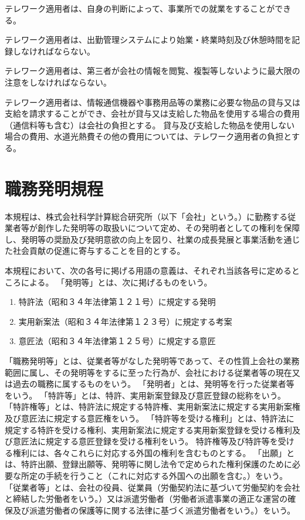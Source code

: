\documentclass[10pt,a4paper,uplatex]{jsarticle}
\begin{document}
テレワーク適用者は、自身の判断によって、事業所での就業をすることができる。

テレワーク適用者は、出勤管理システムにより始業・終業時刻及び休憩時間を記録しなければならない。

テレワーク適用者は、第三者が会社の情報を閲覧、複製等しないように最大限の注意をしなければならない。

テレワーク適用者は、情報通信機器や事務用品等の業務に必要な物品の貸与又は支給を請求することができ、会社が貸与又は支給した物品を使用する場合の費用（通信料等も含む）は会社の負担とする。
\term 貸与及び支給した物品を使用しない場合の費用、水道光熱費その他の費用については、テレワーク適用者の負担とする。

\clearpage
\section{職務発明規程}

本規程は、株式会社科学計算総合研究所（以下「会社」という。）に勤務する従業者等が創作した発明等の取扱いについて定め、その発明者としての権利を保障し、発明等の奨励及び発明意欲の向上を図り、社業の成長発展と事業活動を通じた社会貢献の促進に寄与することを目的とする。

本規程において、次の各号に掲げる用語の意義は、それぞれ当該各号に定めるところによる。
\term 「発明等」とは、次に掲げるものをいう。
\begin{enumerate}
    \item 特許法（昭和３４年法律第１２１号）に規定する発明
    \item 実用新案法（昭和３４年法律第１２３号）に規定する考案
    \item 意匠法（昭和３４年法律第１２５号）に規定する意匠
\end{enumerate}
\term 「職務発明等」とは、従業者等がなした発明等であって、その性質上会社の業務範囲に属し、その発明等をするに至った行為が、会社における従業者等の現在又は過去の職務に属するものをいう。
\term 「発明者」とは、発明等を行った従業者等をいう。
\term 「特許等」とは、特許、実用新案登録及び意匠登録の総称をいう。
\term 「特許権等」とは、特許法に規定する特許権、実用新案法に規定する実用新案権及び意匠法に規定する意匠権をいう。
\term 「特許等を受ける権利」とは、特許法に規定する特許を受ける権利、実用新案法に規定する実用新案登録を受ける権利及び意匠法に規定する意匠登録を受ける権利をいう。
\term 特許権等及び特許等を受ける権利には、各々これらに対応する外国の権利を含むものとする。
\term 「出願」とは、特許出願、登録出願等、発明等に関し法令で定められた権利保護のために必要な所定の手続を行うこと（これに対応する外国への出願を含む。）をいう。
\term 「従業者等」とは、会社の役員、従業員（労働契約法に基づいて労働契約を会社と締結した労働者をいう。）又は派遣労働者（労働者派遣事業の適正な運営の確保及び派遣労働者の保護等に関する法律に基づく派遣労働者をいう。）をいう。
\end{document}
